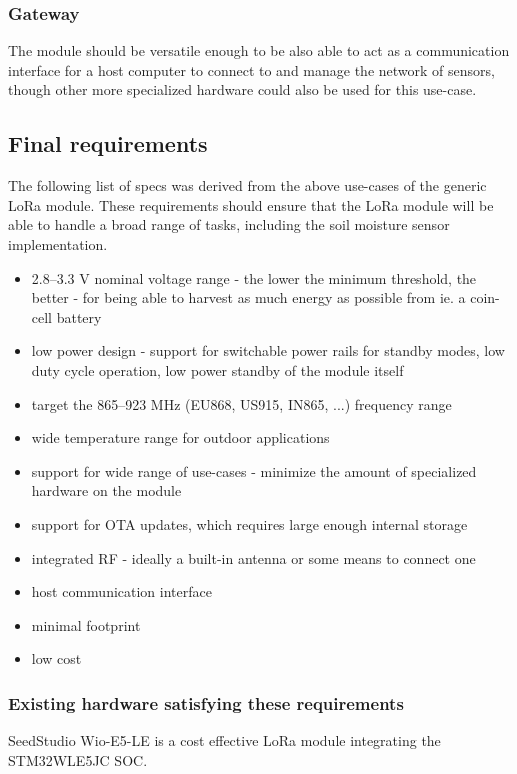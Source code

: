 \subsubsection{Gateway}
The module should be versatile enough to be also able to act as a communication interface for a host computer to connect to and manage the network of sensors, though other more specialized hardware could also be used for this use-case.

\subsection{\label{section:final-requirements}Final requirements}
The following list of specs was derived from the above use-cases of the generic LoRa module. These requirements should ensure that the LoRa module will be able to handle a broad range of tasks, including the soil moisture sensor implementation.
\begin{itemize}
    \item 2.8--3.3 V nominal voltage range - the lower the minimum threshold, the better - for being able to harvest as much energy as possible from ie. a coin-cell battery
    \item low power design - support for switchable power rails for standby modes, low duty cycle operation, low power standby of the module itself
    \item target the 865--923 MHz (EU868, US915, IN865, ...) frequency range
    \item wide temperature range for outdoor applications
    \item support for wide range of use-cases - minimize the amount of specialized hardware on the module
    \item support for OTA updates, which requires large enough internal storage
    \item integrated RF - ideally a built-in antenna or some means to connect one
    \item host communication interface
    \item minimal footprint
    \item low cost
\end{itemize}

\subsubsection{Existing hardware satisfying these requirements}
SeedStudio Wio-E5-LE \cite{stmicroelectronics_lora_2024, seeedstudio_wio-e5-wireless_2024} is a cost effective LoRa module integrating the STM32WLE5JC SOC.

